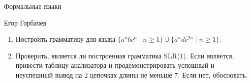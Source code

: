 \documentclass[12pt]{article}
\begin{document}
\begin{center}
{\LARGE Формальные языки}

\bigskip

{\Large Егор Горбачев}
\end{center} 

\bigskip

\begin{enumerate}
  \item Построить грамматику для языка $\{ a^n b c^n \mid n \geq 1 \} \cup \{ a^n d c^{2n} \mid n \geq 1 \}$.
  \item Проверить, является ли построенная грамматика SLR(1). Если является, привести таблицу анализатора и продемонстрировать успешный и неуспешный вывод на 2 цепочках длины не меньше 7. Если нет, обосновать. 
\end{enumerate}
\end{document}
